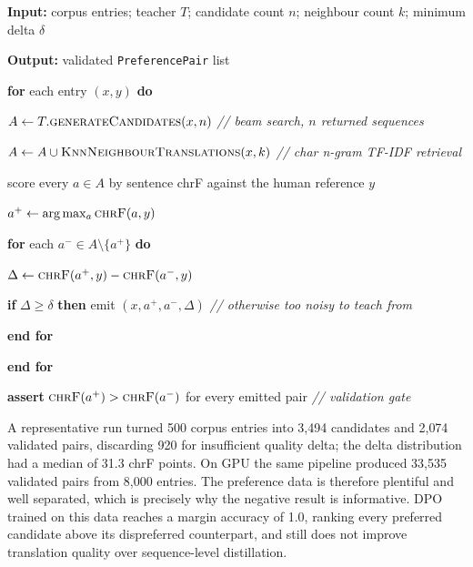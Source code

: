 \noindent \textbf{Input:} corpus entries; teacher $T$; candidate count $n$; neighbour count $k$; minimum delta $\delta$\par\nopagebreak
\noindent \textbf{Output:} validated \texttt{PreferencePair} list\par\nopagebreak
\vspace{2pt}
\begin{algsteps}
\item \textbf{for} each entry $(x, y)$ \textbf{do}
\item \algind $A \leftarrow T.\textsc{generateCandidates}(x, n)$ \quad \textit{// beam search, $n$ returned sequences}
\item \algind $A \leftarrow A \cup \textsc{KnnNeighbourTranslations}(x, k)$ \quad \textit{// char n-gram TF-IDF retrieval}
\item \algind score every $a \in A$ by sentence chrF against the human reference $y$
\item \algind $a^{+} \leftarrow \arg\max_a \textsc{chrF}(a, y)$
\item \algind \textbf{for} each $a^{-} \in A \setminus \{a^{+}\}$ \textbf{do}
\item \algind \algind $\Delta \leftarrow \textsc{chrF}(a^{+}, y) - \textsc{chrF}(a^{-}, y)$
\item \algind \algind \textbf{if} $\Delta \geq \delta$ \textbf{then} emit $(x, a^{+}, a^{-}, \Delta)$ \quad \textit{// otherwise too noisy to teach from}
\item \algind \textbf{end for}
\item \textbf{end for}
\item \textbf{assert} $\textsc{chrF}(a^{+}) > \textsc{chrF}(a^{-})$ for every emitted pair \quad \textit{// validation gate}
\end{algsteps}

A representative run turned 500 corpus entries into 3{,}494 candidates and
2{,}074 validated pairs, discarding 920 for insufficient quality delta; the
delta distribution had a median of 31.3 chrF points. On GPU the same pipeline
produced 33{,}535 validated pairs from 8{,}000 entries. The preference data is
therefore plentiful and well separated, which is precisely why the negative
result is informative. DPO trained on this data reaches a margin accuracy of
1.0, ranking every preferred candidate above its dispreferred counterpart, and
still does not improve translation quality over sequence-level distillation.

